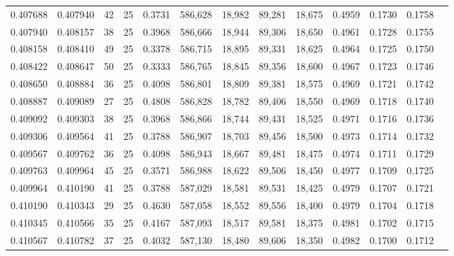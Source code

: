 \begin{tabular}{rrrrrrrrrrrrr}
0.407688 & 0.407940 &    42 &  25 &                                     0.3731 & 586,628 &  18,982 &  89,281 &  18,675 & 0.4959 & 0.1730 & 0.1758 \\
0.407940 & 0.408157 &    38 &  25 &                                     0.3968 & 586,666 &  18,944 &  89,306 &  18,650 & 0.4961 & 0.1728 & 0.1755 \\
0.408158 & 0.408410 &    49 &  25 &                                     0.3378 & 586,715 &  18,895 &  89,331 &  18,625 & 0.4964 & 0.1725 & 0.1750 \\
0.408422 & 0.408647 &    50 &  25 &                                     0.3333 & 586,765 &  18,845 &  89,356 &  18,600 & 0.4967 & 0.1723 & 0.1746 \\
0.408650 & 0.408884 &    36 &  25 &                                     0.4098 & 586,801 &  18,809 &  89,381 &  18,575 & 0.4969 & 0.1721 & 0.1742 \\
0.408887 & 0.409089 &    27 &  25 &                                     0.4808 & 586,828 &  18,782 &  89,406 &  18,550 & 0.4969 & 0.1718 & 0.1740 \\
0.409092 & 0.409303 &    38 &  25 &                                     0.3968 & 586,866 &  18,744 &  89,431 &  18,525 & 0.4971 & 0.1716 & 0.1736 \\
0.409306 & 0.409564 &    41 &  25 &                                     0.3788 & 586,907 &  18,703 &  89,456 &  18,500 & 0.4973 & 0.1714 & 0.1732 \\
0.409567 & 0.409762 &    36 &  25 &                                     0.4098 & 586,943 &  18,667 &  89,481 &  18,475 & 0.4974 & 0.1711 & 0.1729 \\
0.409763 & 0.409964 &    45 &  25 &                                     0.3571 & 586,988 &  18,622 &  89,506 &  18,450 & 0.4977 & 0.1709 & 0.1725 \\
0.409964 & 0.410190 &    41 &  25 &                                     0.3788 & 587,029 &  18,581 &  89,531 &  18,425 & 0.4979 & 0.1707 & 0.1721 \\
0.410190 & 0.410343 &    29 &  25 &                                     0.4630 & 587,058 &  18,552 &  89,556 &  18,400 & 0.4979 & 0.1704 & 0.1718 \\
0.410345 & 0.410566 &    35 &  25 &                                     0.4167 & 587,093 &  18,517 &  89,581 &  18,375 & 0.4981 & 0.1702 & 0.1715 \\
0.410567 & 0.410782 &    37 &  25 &                                     0.4032 & 587,130 &  18,480 &  89,606 &  18,350 & 0.4982 & 0.1700 & 0.1712 \\

\end{tabular}
